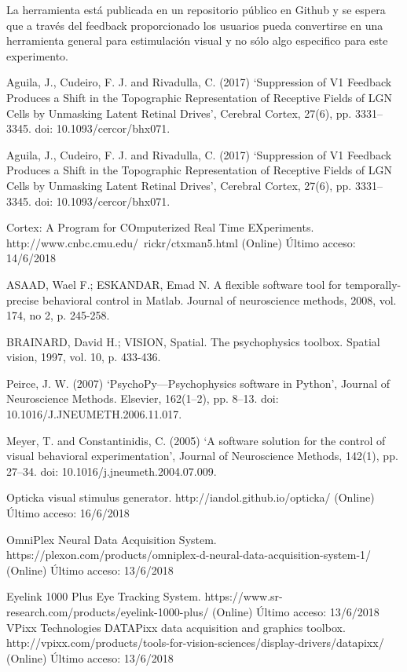 \documentclass[conference]{IEEEtran}
\begin{document}
La herramienta está publicada en un repositorio público en Github\cite{stimpackrepo} y se espera que a través del feedback proporcionado los usuarios pueda convertirse en una herramienta general para estimulación visual y no sólo algo especifico para este experimento.


\begin{thebibliography}{00}
 Aguila, J., Cudeiro, F. J. and Rivadulla, C. (2017) ‘Suppression of V1 Feedback Produces a Shift in the Topographic Representation of Receptive Fields of LGN Cells by Unmasking Latent Retinal Drives’, Cerebral Cortex, 27(6), pp. 3331–3345. doi: 10.1093/cercor/bhx071.

 Aguila, J., Cudeiro, F. J. and Rivadulla, C. (2017) ‘Suppression of V1 Feedback Produces a Shift in the Topographic Representation of Receptive Fields of LGN Cells by Unmasking Latent Retinal Drives’, Cerebral Cortex, 27(6), pp. 3331–3345. doi: 10.1093/cercor/bhx071.

 Cortex: A Program for COmputerized Real Time EXperiments. http://www.cnbc.cmu.edu/~rickr/ctxman5.html (Online) Último acceso: 14/6/2018


ASAAD, Wael F.; ESKANDAR, Emad N. A flexible software tool for temporally-precise behavioral control in Matlab. Journal of neuroscience methods, 2008, vol. 174, no 2, p. 245-258.


 BRAINARD, David H.; VISION, Spatial. The psychophysics toolbox. Spatial vision, 1997, vol. 10, p. 433-436.

 Peirce, J. W. (2007) ‘PsychoPy—Psychophysics software in Python’, Journal of Neuroscience Methods. Elsevier, 162(1–2), pp. 8–13. doi: 10.1016/J.JNEUMETH.2006.11.017.

 Meyer, T. and Constantinidis, C. (2005) ‘A software solution for the control of visual behavioral experimentation’, Journal of Neuroscience Methods, 142(1), pp. 27–34. doi: 10.1016/j.jneumeth.2004.07.009.

 Opticka visual stimulus generator. http://iandol.github.io/opticka/ (Online) Último acceso: 16/6/2018


 OmniPlex Neural Data Acquisition System. https://plexon.com/products/omniplex-d-neural-data-acquisition-system-1/ (Online) Último acceso: 13/6/2018

 Eyelink 1000 Plus Eye Tracking System. https://www.sr-research.com/products/eyelink-1000-plus/ (Online) Último acceso: 13/6/2018
 VPixx Technologies DATAPixx data acquisition and graphics toolbox. http://vpixx.com/products/tools-for-vision-sciences/display-drivers/datapixx/  (Online) Último acceso: 13/6/2018


\end{thebibliography}
\end{document}
